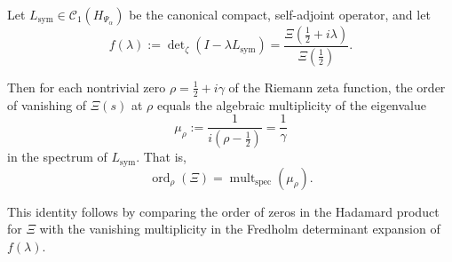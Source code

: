 \begin{lemma}
\label{lem:hadamard_fredholm_multiplicity}
Let \( L_{\mathrm{sym}} \in \mathcal{C}_1(H_{\Psi_\alpha}) \) be the canonical compact, self-adjoint operator, and let
\[
f(\lambda) := \det\nolimits_\zeta(I - \lambda L_{\mathrm{sym}})
= \frac{\Xi\left(\tfrac{1}{2} + i\lambda\right)}{\Xi\left(\tfrac{1}{2}\right)}.
\]

Then for each nontrivial zero \( \rho = \tfrac{1}{2} + i\gamma \) of the Riemann zeta function, the order of vanishing of \( \Xi(s) \) at \( \rho \) equals the algebraic multiplicity of the eigenvalue
\[
\mu_\rho := \frac{1}{i(\rho - \tfrac{1}{2})} = \frac{1}{\gamma}
\]
in the spectrum of \( L_{\mathrm{sym}} \). That is,
\[
\operatorname{ord}_\rho(\Xi)
= \operatorname{mult}_{\mathrm{spec}}(\mu_\rho).
\]

\medskip
\noindent
This identity follows by comparing the order of zeros in the Hadamard product for \( \Xi \) with the vanishing multiplicity in the Fredholm determinant expansion of \( f(\lambda) \).
\end{lemma}
% 